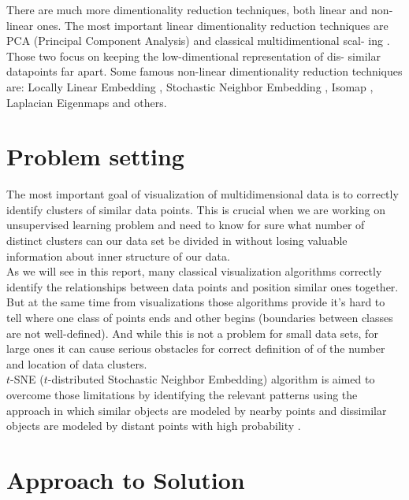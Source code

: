 There are much more dimentionality reduction techniques, both linear and
non-linear ones. The most important linear dimentionality reduction techniques
are PCA (Principal Component Analysis)\cite{pca} and classical multidimentional scal-
ing \cite{mds}. Those two focus on keeping the low-dimentional representation of dis-
similar datapoints far apart. Some famous non-linear dimentionality reduction
techniques are: Locally Linear Embedding \cite{lle}, Stochastic Neighbor Embedding \cite{snearticle}, Isomap \cite{isomap}, Laplacian Eigenmaps \cite{lapeig} and others.

\section{Problem setting}

The most important goal of visualization of multidimensional data is to correctly identify clusters of similar data points. This is crucial when we are working on unsupervised learning problem and need to know for sure what number of distinct clusters can our data set be divided in without losing valuable information about inner structure of our data.\\

 As we will see in this report, many classical visualization algorithms correctly identify the relationships between data points and position similar ones together. But at the same time from visualizations those algorithms provide it's hard to tell where one class of points ends and other begins (boundaries between classes are not well-defined). And while this is not a problem for small data sets, for large ones it can cause serious obstacles for correct definition of of the number and location of data clusters. \\

$t$-SNE ($t$-distributed Stochastic Neighbor Embedding) algorithm is aimed to overcome those limitations by identifying the relevant patterns using the approach in which similar objects are modeled by nearby points and dissimilar objects are modeled by distant points with high probability \cite{tsnearticle}. 

\section{Approach to Solution}

